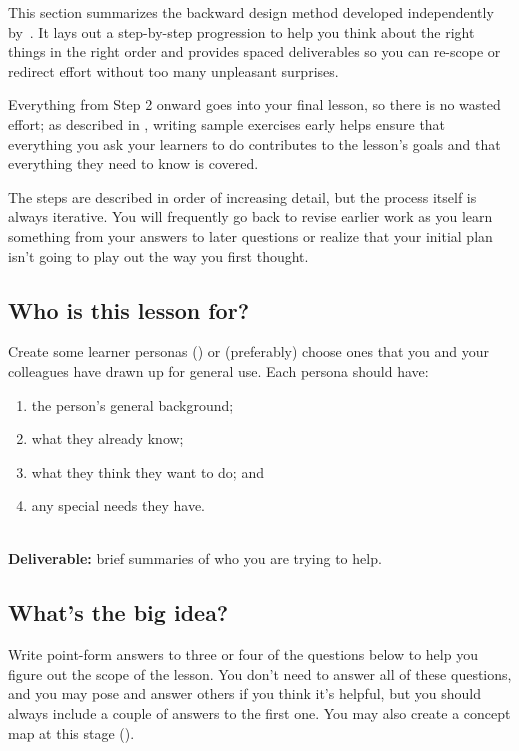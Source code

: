 This section summarizes the backward design method
developed independently by~\cite{Wigg2005,Bigg2011,Fink2013}.
It lays out a step-by-step progression
to help you think about the right things in the right order
and provides spaced deliverables
so you can re-scope or redirect effort without too many unpleasant surprises.

Everything from Step 2 onward goes into your final lesson,
so there is no wasted effort;
as described in ,
writing sample exercises early helps ensure that
everything you ask your learners to do contributes to the lesson's goals
and that everything they need to know is covered.

The steps are described in order of increasing detail,
but the process itself is always iterative.
You will frequently go back to revise earlier work
as you learn something from your answers to later questions
or realize that your initial plan isn't going to play out the way you first thought.

\subsection*{Who is this lesson for?}

Create some learner personas ()
or (preferably) choose ones that you and your colleagues have drawn up for general use.
Each persona should have:

\begin{enumerate}

\item
  the person's general background;

\item
  what they already know;

\item
  what they think they want to do; and

\item
  any special needs they have.

\end{enumerate}

~\\
\noindent
\textbf{Deliverable:} brief summaries of who you are trying to help.

\subsection*{What's the big idea?}

Write point-form answers to three or four of the questions below
to help you figure out the scope of the lesson.
You don't need to answer all of these questions,
and you may pose and answer others if you think it's helpful,
but you should always include a couple of answers to the first one.
You may also create a concept map at this stage ().

